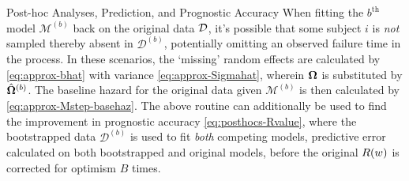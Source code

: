 \begin{chapter}{\label{cha:posthoc}Post-hoc Analyses, Prediction, and Prognostic Accuracy}
When fitting the $b^{\mathrm{th}}$ model $\mathcal{M}^{(b)}$ back on the original data $\cal D$, it's possible that some subject $i$ is \textit{not} sampled thereby absent in $\mathcal{D}^{(b)}$, potentially omitting an observed failure time in the process. In these scenarios, the `missing' random effects are calculated by \eqref{eq:approx-bhat} with variance \eqref{eq:approx-Sigmahat}, wherein $\bm{\mathrm{\Omega}}$ is substituted by $\hat{\bm{\Omega}}^{(b)}$. The baseline hazard for the original data given $\mathcal{M}^{(b)}$ is then calculated by \eqref{eq:approx-Mstep-basehaz}. The above routine can additionally be used to find the improvement in prognostic accuracy \eqref{eq:posthocs-Rvalue}, where the bootstrapped data $\mathcal{D}^{(b)}$ is used to fit \textit{both} competing models, predictive error calculated on both bootstrapped and original models, before the original $R\!\left( w\right)$ is corrected for optimism $B$ times.

\end{chapter}